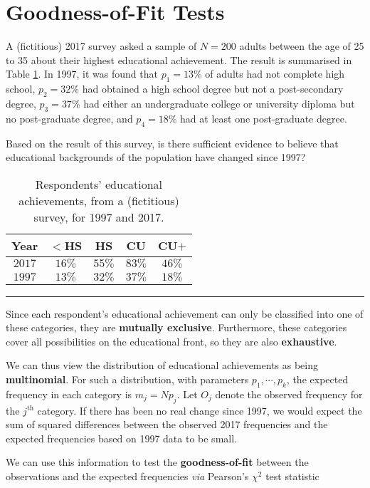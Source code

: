 \section{Goodness-of-Fit Tests}
A (fictitious) 2017 survey asked a sample of $N=200$ adults between the age of 25 to 35 about their highest educational achievement. The result is summarised in Table \ref{tab:SA6}. In 1997, it was found that $p_1=13\%$ of adults had not complete high school, $p_2=32\%$ had obtained a high school degree but not a post-secondary degree, $p_3=37\%$ had either an undergraduate college or university diploma but no post-graduate degree, and $p_4=18\%$ had at least one post-graduate degree. \par Based on the result of this survey, is there sufficient evidence to believe that educational backgrounds of the population have changed since 1997?
     \begin{table}[!t]
         \centering
         \begin{tabular}{c c c c c}
         \hline
\textbf{Year} &       $\mathbf{<}$\textbf{HS} & \textbf{HS} & \textbf{CU} & \textbf{CU}$\mathbf{+}$ \\
         \hline
$2017$ &       $16\%$ & $55\%$ & $83\%$ & $46\%$ \\
$1997$ &       $13\%$ & $32\%$ & $37\%$ & $18\%$ \\
        \hline
         \end{tabular}
         \caption[\small Respondents' educational achievements]{\small Respondents' educational achievements, from a (fictitious) survey, for 1997 and 2017.}
         \label{tab:SA6}\hrule 
     \end{table}
\newl Since each respondent's educational achievement can only be classified into one of these categories, they are  \textbf{mutually exclusive}. Furthermore, these categories cover all possibilities on the educational front, so they are also \textbf{exhaustive}. \par We can thus view the distribution of educational achievements as being \textbf{multinomial}. For such a distribution, with parameters $p_{1},\cdots,p_{k}$, the expected frequency in each category is $m_{j}=Np_{j}$. \newl  Let $O_{j}$ denote the observed frequency for the $j^{\text{th}}$ category. If there has been no real change since 1997, we would expect the sum of squared differences between the observed 2017 frequencies and the expected frequencies based on 1997 data to be small. \par We can use this information to test the \textbf{goodness-of-fit} between the observations and the expected frequencies \textit{via} Pearson's $\chi^{2}$ test statistic 
